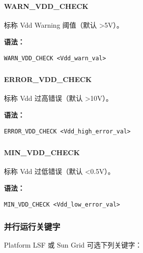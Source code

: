\subsubsection{}
\paragraph*{WARN_VDD_CHECK}

标称 Vdd Warning 阈值（默认 >5V）。

\textbf{语法：}
\begin{lstlisting}
WARN_VDD_CHECK <Vdd_warn_val>
\end{lstlisting}

\subsubsection{}
\paragraph*{ERROR_VDD_CHECK}

标称 Vdd 过高错误（默认 >10V）。

\textbf{语法：}
\begin{lstlisting}
ERROR_VDD_CHECK <Vdd_high_error_val>
\end{lstlisting}

\subsubsection{}
\paragraph*{MIN_VDD_CHECK}

标称 Vdd 过低错误（默认 <0.5V）。

\textbf{语法：}
\begin{lstlisting}
MIN_VDD_CHECK <Vdd_low_error_val>
\end{lstlisting}

\subsubsection{并行运行关键字}
Platform LSF 或 Sun Grid 可选下列关键字：

\subsubsection{}
